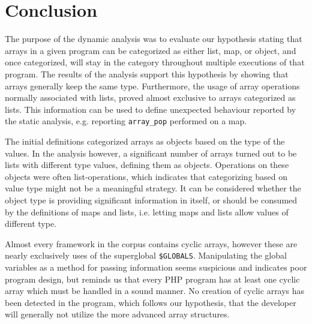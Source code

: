 \section{Conclusion}
\label{sec:studyConclusion}
The purpose of the dynamic analysis was to evaluate our hypothesis stating that arrays in a given program can be categorized as either list, map, or object, and once categorized, will stay in the category throughout multiple executions of that program. The results of the analysis support this hypothesis by showing that arrays generally keep the same type. Furthermore, the usage of array operations normally associated with lists, proved almost exclusive to arrays categorized as lists. This information can be used to define unexpected behaviour reported by the static analysis, e.g. reporting \texttt{array\_pop} performed on a map. 

The initial definitions categorized arrays as objects based on the type of the values. In the analysis however, a significant number of arrays turned out to be lists with different type values, defining them as objects. Operations on these objects were often list-operations, which indicates that categorizing based on value type might not be a meaningful strategy. It can be considered whether the object type is providing significant information in itself, or should be consumed by the definitions of maps and lists, i.e. letting maps and lists allow values of different type.

Almost every framework in the corpus contains cyclic arrays, however these are nearly exclusively uses of the superglobal \texttt{\$GLOBALS}. Manipulating the global variables as a method for passing information seems suspicious and indicates poor program design, but reminds us that every PHP program has at least one cyclic array which must be handled in a sound manner. No creation of cyclic arrays has been detected in the program, which follows our hypothesis, that the developer will generally not utilize the more advanced array structures. 